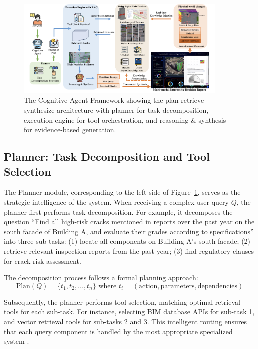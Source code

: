 \begin{figure}[htbp]
\centering
\includegraphics[width=0.9\textwidth]{figures/DefectGPT/The Cognitive Agent Framework.png}
\caption{The Cognitive Agent Framework showing the plan-retrieve-synthesize architecture with planner for task decomposition, execution engine for tool orchestration, and reasoning \& synthesis for evidence-based generation.}
\label{fig:cognitive-agent-framework}
\end{figure}

\subsection{Planner: Task Decomposition and Tool Selection}

The Planner module, corresponding to the left side of Figure~\ref{fig:cognitive-agent-framework}, serves as the strategic intelligence of the system. When receiving a complex user query $Q$, the planner first performs task decomposition. For example, it decomposes the question ``Find all high-risk cracks mentioned in reports over the past year on the south facade of Building A, and evaluate their grades according to specifications'' into three sub-tasks: (1) locate all components on Building A's south facade; (2) retrieve relevant inspection reports from the past year; (3) find regulatory clauses for crack risk assessment.

The decomposition process follows a formal planning approach:
\begin{equation}
\text{Plan}(Q) = \{t_1, t_2, ..., t_n\} \text{ where } t_i = (\text{action}, \text{parameters}, \text{dependencies})
\end{equation}

Subsequently, the planner performs tool selection, matching optimal retrieval tools for each sub-task. For instance, selecting BIM database APIs for sub-task 1, and vector retrieval tools for sub-tasks 2 and 3. This intelligent routing ensures that each query component is handled by the most appropriate specialized system \cite{yao2022react}.

